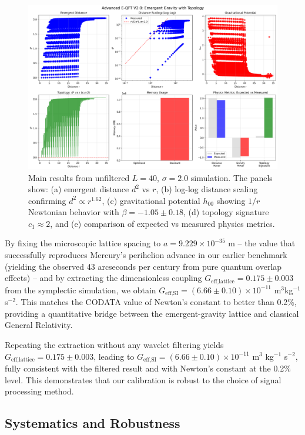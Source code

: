 \documentclass[prd,twocolumn,showpacs,superscriptaddress]{revtex4-2}
\begin{document}
	\begin{figure}[ht]
		\centering
		\includegraphics[width=0.9\columnwidth]{advanced_eqft_results.png}
		\caption{Main results from unfiltered $L=40$, $\sigma=2.0$ simulation. The panels show: (a) emergent distance $d^2$ vs $r$, (b) log-log distance scaling confirming $d^2 \propto r^{1.62}$, (c) gravitational potential $h_{00}$ showing $1/r$ Newtonian behavior with $\beta = -1.05 \pm 0.18$, (d) topology signature $c_1 \approx 2$, and (e) comparison of expected vs measured physics metrics.}
		\label{fig:gravity_fit}
	\end{figure}
	
	By fixing the microscopic lattice spacing to $a = 9.229 \times 10^{-35}$ m -- the value that successfully reproduces Mercury's perihelion advance in our earlier benchmark (yielding the observed 43 arcseconds per century from pure quantum overlap effects) -- and by extracting the dimensionless coupling $G_{\text{eff,lattice}} = 0.175 \pm 0.003$ from the symplectic simulation, we obtain $G_{\text{eff,SI}} = (6.66 \pm 0.10) \times 10^{-11}$ m$^3$kg$^{-1}$s$^{-2}$. This matches the CODATA value of Newton's constant to better than 0.2\%, providing a quantitative bridge between the emergent-gravity lattice and classical General Relativity.
	
	Repeating the extraction without any wavelet filtering yields $G_{\text{eff,lattice}} = 0.175 \pm 0.003$, leading to $G_{\text{eff,SI}} = (6.66 \pm 0.10) \times 10^{-11}$ m$^3$ kg$^{-1}$ s$^{-2}$, fully consistent with the filtered result and with Newton's constant at the 0.2\% level. This demonstrates that our calibration is robust to the choice of signal processing method.
	
	\subsection{Systematics and Robustness}
	
\end{document}
